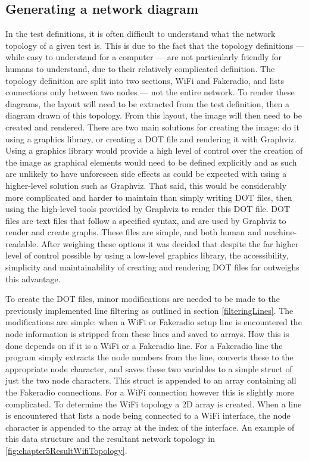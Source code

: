 \subsection{Generating a network diagram}
In the test definitions, it is often difficult to understand what the network topology of a given test is.
This is due to the fact that the topology definitions — while easy to understand for a computer — are not particularly friendly for humans to understand, due to their relatively complicated definition.
The topology definition are split into two sections, WiFi and Fakeradio, and lists connections only between two nodes — not the entire network.
To render these diagrams, the layout will need to be extracted from the test definition, then a diagram drawn of this topology.
From this layout, the image will then need to be created and rendered.
There are two main solutions for creating the image: do it using a graphics library, or creating a DOT file and rendering it with Graphviz.
Using a graphics library would provide a high level of control over the creation of the image as graphical elements would need to be defined explicitly and as such are unlikely to have unforeseen side effects as could be expected with using a higher-level solution such as Graphviz.
That said, this would be considerably more complicated and harder to maintain than simply writing DOT files, then using the high-level tools provided by Graphviz to render this DOT file.
DOT files are text files that follow a specified syntax, and are used by Graphviz to render and create graphs.
These files are simple, and both human and machine-readable. 
After weighing these options it was decided that despite the far higher level of control possible by using a low-level graphics library, the accessibility, simplicity and maintainability of creating and rendering DOT files far outweighs this advantage.

To create the DOT files, minor modifications are needed to be made to the previously implemented line filtering as outlined in section \ref{filteringLines}.
The modifications are simple: when a WiFi or Fakeradio setup line is encountered the node information is stripped from these lines and saved to arrays.
How this is done depends on if it is a WiFi or a Fakeradio line.
For a Fakeradio line the program simply extracts the node numbers  from the line, converts these to the appropriate node character, and saves these two variables to a simple struct of just the two node characters.
This struct is appended to an array containing all the Fakeradio connections.
For a WiFi connection however this is slightly more complicated.
To determine the WiFi topology a 2D array is created.
When a line is encountered that lists a node being connected to a WiFi interface, the node character is appended to the array at the index of the interface.
An example of this data structure and the resultant network topology in \figurename{ \ref{fig:chapter5ResultWifiTopology}}.

